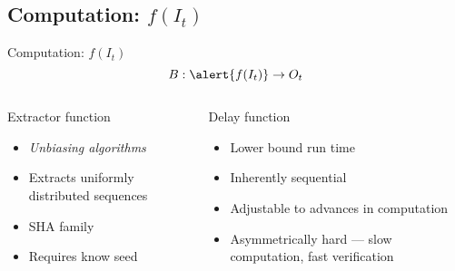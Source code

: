 \subsection{Computation: $f(I_t)$}

\begin{frame}{Computation: $f(I_t)$}
    \begin{equation*}
        B: \alert{f(I_t)} \rightarrow O_t
    \end{equation*}
    \begin{columns}[t]
        \begin{column}{0.5\textwidth}
            Extractor function
            \begin{itemize}
                \item \textit{Unbiasing algorithms}
                \item Extracts uniformly distributed sequences
                \item SHA family
                \item Requires know seed
            \end{itemize}
        \end{column}
        \begin{column}{0.5\textwidth}
            Delay function
            \begin{itemize}
                \item Lower bound run time
                \item Inherently sequential
                \item Adjustable to advances in computation
                \item Asymmetrically hard --- slow computation, fast verification
            \end{itemize}
        \end{column}
    \end{columns}
\end{frame}
